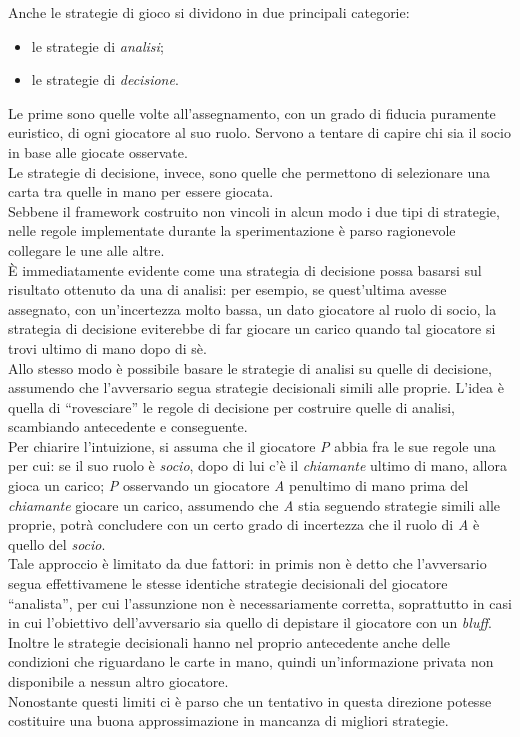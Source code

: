 Anche le strategie di gioco si dividono in due principali categorie:
\begin{itemize}
   \item le strategie di \emph{analisi};
   \item le strategie di \emph{decisione}.
\end{itemize}
Le prime sono quelle volte all'assegnamento, con un grado di fiducia puramente euristico, di ogni giocatore al suo ruolo.
Servono a tentare di capire chi sia il socio in base alle giocate osservate.\\
Le strategie di decisione, invece, sono quelle che permettono di selezionare una carta tra quelle in mano per essere giocata.\\
Sebbene il framework costruito non vincoli in alcun modo i due tipi di strategie, nelle regole implementate durante la sperimentazione  è parso ragionevole collegare le une alle altre.\\
È immediatamente evidente come una strategia di decisione possa basarsi sul risultato ottenuto da una di analisi: per esempio, se quest'ultima avesse assegnato, con un'incertezza molto bassa, un dato giocatore al ruolo di socio, la strategia di decisione eviterebbe di far giocare un carico quando tal giocatore si trovi ultimo di mano dopo di sè.\\

Allo stesso modo è possibile basare le strategie di analisi su quelle di decisione, assumendo che l'avversario segua strategie decisionali simili alle proprie.
L'idea è quella di ``rovesciare'' le regole di decisione per costruire quelle di analisi, scambiando antecedente e conseguente.\\
Per chiarire l'intuizione, si assuma che il giocatore \emph{P} abbia fra le sue regole una per cui: se il suo ruolo è \emph{socio}, dopo di lui c'è il \emph{chiamante} ultimo di mano, allora gioca un carico; \emph{P} osservando un giocatore \emph{A} penultimo di mano prima del \emph{chiamante} giocare un carico, assumendo che \emph{A} stia seguendo strategie simili alle proprie, potrà concludere con un certo grado di incertezza che il ruolo di \emph{A} è quello del \emph{socio}.\\
Tale approccio è limitato da due fattori: in primis non è detto che l'avversario segua effettivamene le stesse identiche strategie decisionali del giocatore ``analista'', per cui l'assunzione non è necessariamente corretta, soprattutto in casi in cui l'obiettivo dell'avversario sia quello di depistare il giocatore con un \emph{bluff}.\\
Inoltre le strategie decisionali hanno nel proprio antecedente anche delle condizioni che riguardano le carte in mano, quindi un'informazione privata non disponibile a nessun altro giocatore.\\
Nonostante questi limiti ci è parso che un tentativo in questa direzione potesse costituire una buona approssimazione in mancanza di migliori strategie.\\




